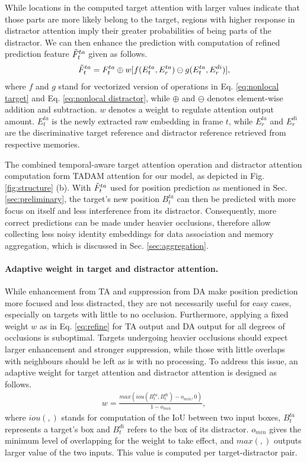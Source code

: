 \documentclass[final]{cvpr}
\begin{document}
While locations in the computed target attention with larger values indicate that those parts are more likely belong to the target, regions with higher response in distractor attention imply their greater probabilities of being parts of the distractor. We can then enhance the prediction with computation of refined prediction feature \(\Tilde{F}^{ta}_t\) given as follows.
\begin{align}
  \Tilde{F}^{ta}_t = F^{ta}_t \oplus w [f(E^{ta}_t, E^{ta}_r) \ominus g(E^{ta}_t, E^{di}_r)],
  \label{eq:refine}
\end{align}
where \(f\) and \(g\) stand for vectorized version of operations in Eq. \ref{eq:nonlocal target} and Eq. \ref{eq:nonlocal distractor}, while \(\oplus\) and \(\ominus\) denotes element-wise addition and subtraction. \(w\) denotes a weight to regulate attention output amount. \(E^{ta}_t\) is the newly extracted raw embedding in frame \(t\), while \(E^{ta}_r\) and \(E^{di}_r\) are the discriminative target reference and distractor reference retrieved from respective memories.

The combined temporal-aware target attention operation and distractor attention computation form TADAM attention for our model, as depicted in Fig. \ref{fig:structure} (b).
With \(\Tilde{F}^{ta}_t\) used for position prediction as mentioned in Sec. \ref{sec:preliminary}, the target's new position \(B^{ta}_t\) can then be predicted with more focus on itself and less interference from its distractor. Consequently, more correct predictions can be made under heavier occlusions, therefore allow collecting less noisy identity embeddings for data association and memory aggregation, which is discussed in Sec. \ref{sec:aggregation}.

\paragraph{Adaptive weight in target and distractor attention.}
While enhancement from TA and suppression from DA make position prediction more focused and less distracted, they are not necessarily useful for easy cases, especially on targets with little to no occlusion. Furthermore, applying a fixed weight \(w\) as in Eq. \ref{eq:refine} for TA output and DA output for all degrees of occlusions is suboptimal. Targets undergoing heavier occlusions should expect larger enhancement and stronger suppression, while those with little overlaps with neighbours should be left as is with no processing. To address this issue, an adaptive weight for target attention and distractor attention is designed as follows.
\begin{align}
  w = \frac{max(iou(B^{ta}_t, B^{di}_t) - o_{min}, 0)}{1 - o_{min}},
\end{align}
where \(iou(,)\) stands for computation of the IoU between two input boxes, \(B^{ta}_t\) represents a target's box and \(B^{di}_t\) refers to the box of its distractor. \(o_{min}\) gives the minimum level of overlapping for the weight to take effect, and \(max(,)\) outputs larger value of the two inputs. This value is computed per target-distractor pair.
\end{document}
